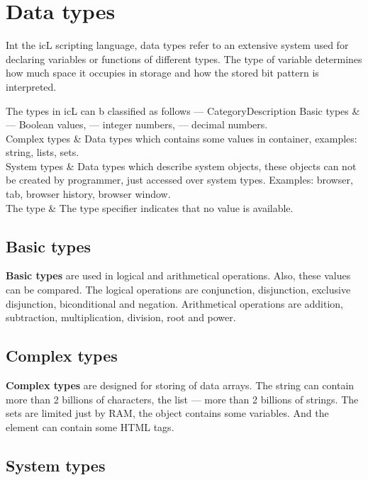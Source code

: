 \section{Data types}

Int the icL scripting language, data types refer to an extensive system used for declaring variables or functions of different types. The type of variable determines how much space it occupies in storage and how the stored bit pattern is interpreted.

The types in icL can b classified as follows —
\stabletwo{3.5cm}{13.6cm}
{}{}{Category}{Description}
{
	Basic types      &  \bool{} — Boolean values, \integer{} — integer numbers, \double{} — decimal numbers. \\ \hline
	Complex types    & Data types which contains some values in container, examples: string, lists, sets. \\ \hline
	System types     & Data types which describe system objects, these objects can not be created by programmer, just accessed over system types. Examples: browser, tab, browser history, browser window. \\ \hline
	The \void{} type & The type specifier \void{} indicates that no value is available.
}

\subsection{Basic types}

{\bf Basic types} are used in logical and arithmetical operations. Also, these values can be compared. The logical operations are conjunction, disjunction, exclusive disjunction, biconditional and negation. Arithmetical operations are addition, subtraction, multiplication, division, root and power.

\subsection{Complex types}

{\bf Complex types} are designed for storing of data arrays. The string can contain more than 2 billions of characters, the list — more than 2 billions of strings. The sets are limited just by RAM, the object contains some variables. And the element can contain some HTML tags.

\subsection{System types}

